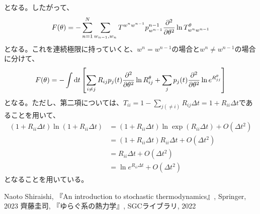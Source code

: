 \documentclass[a4paper,11pt]{jsarticle}
\numberwithin{equation}{section}
\begin{document}
となる。したがって、
\begin{align}
    F(\theta) = -\sum_{n=1}^N \sum_{w_{n-1}, w_n} T^{w^n w^{n-1}} p^{n-1}_{w^{n-1}} \pdv[2]{\theta} \ln T^\theta_{w^n w^{n-1}}
\end{align}
となる。これを連続極限に持っていくと、$w^n = w^{n-1}$の場合と$w^n \neq w^{n-1}$の場合に分けて、
\begin{align}
    F(\theta) = -\int \dd{t} \qty[\sum_{i \neq j} R_{ij} p_j(t) \pdv[2]{\theta} \ln R_{ij}^\theta + \sum_j p_j(t) \pdv[2]{\theta} \ln e^{R_{jj}^\theta}]
\end{align}
となる。ただし、第二項については、$T_{ii} = 1-\sum_{j(\neq i)} R_{ij}\Delta t =1 + R_{ii} \Delta t$であることを用いて、
\begin{align}
    (1+R_{ii}\Delta t )\ln (1+R_{ii}\Delta t) &= (1+R_{ii}\Delta t )\ln \exp(R_{ii}\Delta t) + O(\Delta t^2)\\
    &= (1+R_{ii}\Delta t )R_{ii} \Delta t + O(\Delta t^2)\\
    &= R_{ii} \Delta t + O(\Delta t^2)\\
    &= \ln e^{R_{ii}\Delta t} + O(\Delta t^2)
\end{align}
となることを用いている。\\

\begin{thebibliography}{99}
     Naoto Shiraishi, 『An introduction to stochastic thermodynamics』, Springer, 2023
     齊藤圭司, 『ゆらぐ系の熱力学』, SGCライブラリ, 2022
  \end{thebibliography}
  
\end{document}
